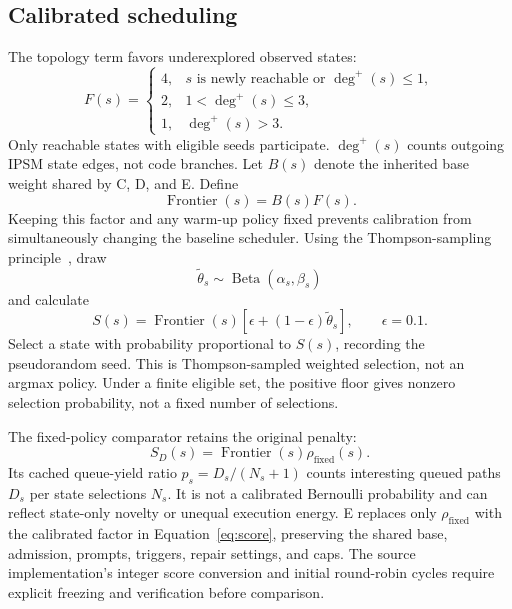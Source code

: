 \documentclass[final,5p,times,number]{elsarticle}
\begin{document}
\subsection{Calibrated scheduling}
The topology term favors underexplored observed states:
\begin{equation}
F(s)=
\begin{cases}
4,&s\text{ is newly reachable or }\deg^+(s)\leq1,\\
2,&1<\deg^+(s)\leq3,\\
1,&\deg^+(s)>3.
\end{cases}
\end{equation}
Only reachable states with eligible seeds participate. $\deg^+(s)$ counts outgoing IPSM state edges, not code branches. Let $B(s)$ denote the inherited base weight shared by C, D, and E. Define
\begin{equation}
\operatorname{Frontier}(s)=B(s)F(s).
\end{equation}
Keeping this factor and any warm-up policy fixed prevents calibration from simultaneously changing the baseline scheduler. Using the Thompson-sampling principle~\cite{thompson1933}, draw
\begin{equation}
\widetilde{\theta}_s\sim\operatorname{Beta}(\alpha_s,\beta_s)
\end{equation}
and calculate
\begin{equation}
S(s)=\operatorname{Frontier}(s)[\epsilon+(1-\epsilon)\widetilde{\theta}_s],
\qquad\epsilon=0.1.
\label{eq:score}
\end{equation}
Select a state with probability proportional to $S(s)$, recording the pseudorandom seed. This is Thompson-sampled weighted selection, not an argmax policy. Under a finite eligible set, the positive floor gives nonzero selection probability, not a fixed number of selections.

The fixed-policy comparator retains the original penalty:
\begin{equation}
S_D(s)=\operatorname{Frontier}(s)\rho_{\mathrm{fixed}}(s).
\end{equation}
Its cached queue-yield ratio $p_s=D_s/(N_s+1)$ counts interesting queued paths $D_s$ per state selections $N_s$. It is not a calibrated Bernoulli probability and can reflect state-only novelty or unequal execution energy. E replaces only $\rho_{\mathrm{fixed}}$ with the calibrated factor in Equation~\ref{eq:score}, preserving the shared base, admission, prompts, triggers, repair settings, and caps. The source implementation's integer score conversion and initial round-robin cycles require explicit freezing and verification before comparison.
\end{document}
